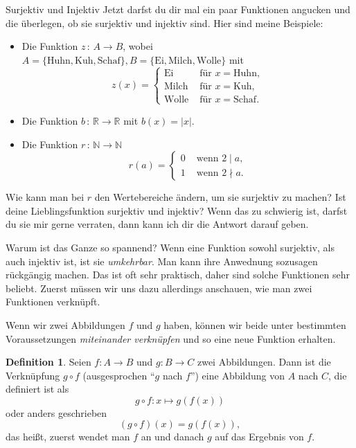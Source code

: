 \documentclass[a4paper,ngerman,12pt]{zirkelblatt1415}
\theoremstyle{definition}
\newtheorem{definition}{Definition}
\theoremstyle{remark}
\begin{document}
\begin{aufgabe}{Surjektiv und Injektiv}
 Jetzt darfst du dir mal ein paar Funktionen angucken und die überlegen, ob sie surjektiv und injektiv sind.
 Hier sind meine Beispiele:
 \begin{itemize}
  \item Die Funktion $z \,:\, A \to B$, wobei 
        $A = \{ \text{Huhn}, \text{Kuh}, \text{Schaf}\}, B = \{\text{Ei}, \text{Milch}, \text{Wolle} \}$ mit 
        \[ z(x) =\begin{cases} 
             \text{Ei} & \text{ für } x = \text{Huhn},\\
              \text{Milch}  & \text{ für } x = \text{Kuh},\\
              \text{Wolle} & \text{ für } x = \text{Schaf}.  
               \end{cases}
         \]
   \item Die Funktion $b \, : \, \mathbb{R} \to \mathbb{R}$ mit $b(x) = | x |$.   
   \item Die Funktion $r \, : \, \mathbb{N} \to \mathbb{N}$
         \[ r(a) = 
         \begin{cases}
          0 & \text{ wenn }2\mid a, \\
          1 & \text{ wenn }2\nmid a.
          \end{cases}
           \]
 \end{itemize}
 Wie kann man bei $r$ den Wertebereiche ändern, um sie surjektiv zu machen?
 Ist deine Lieblingsfunktion surjektiv und injektiv? Wenn das zu schwierig ist, darfst du sie mir gerne verraten, 
 dann kann ich dir die Antwort darauf geben. 
\end{aufgabe}

Warum ist das Ganze so spannend?
Wenn eine Funktion sowohl surjektiv, als auch injektiv ist, ist sie \emph{umkehrbar}.
Man kann ihre Anwednung sozusagen rückgängig machen. Das ist oft sehr praktisch, daher sind solche Funktionen sehr beliebt.
Zuerst müssen wir uns dazu allerdings anschauen, wie man zwei Funktionen verknüpft.

Wenn wir zwei Abbildungen $f$ und $g$ haben, 
können wir beide unter bestimmten Voraussetzungen \emph{miteinander verknüpfen} und so eine neue Funktion erhalten.
\begin{definition}
Seien $f: A\longrightarrow B$ und $g: B\longrightarrow C$ zwei Abbildungen. Dann ist die Verknüpfung $g\circ f$ (ausgesprochen "`$g$ nach $f$"') eine Abbildung von $A$ nach $C$, die definiert ist als
\[
g\circ f: x \mapsto g\left(f(x)\right)
\]
oder anders geschrieben
\begin{equation*}
  (g\circ f)(x)=g(f(x)),
\end{equation*}
das heißt, zuerst wendet man $f$ an und danach $g$ auf das Ergebnis von $f$.
\end{definition}
\end{document}
